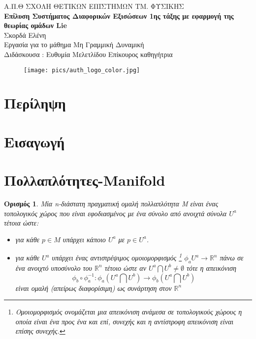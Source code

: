 \documentclass[12pt]{article}
\newtheorem*{definition}{Ορισμός}
\begin{document}
\begin{titlepage}
\begin{center}
\large{{\sc Α.Π.Θ} ΣΧΟΛΗ ΘΕΤΙΚΩΝ ΕΠΙΣΤΗΜΩΝ ΤΜ. ΦΥΣΙΚΗΣ}\\[0.5cm]
\vspace{1cm}
\LARGE\textbf{Επίλυση Συστήματος Διαφορικών Εξισώσεων 1ης τάξης με εφαρμογή της θεωρίας ομάδων \textlatin{Lie} }\\[1.0cm] 

\large{Σκορδά Ελένη}\\[0.2cm]

\vspace{1cm}
\small{Εργασία για το μάθημα Μη Γραμμική Δυναμική}\\[0.1cm] 
\small{Διδάσκουσα : Ευθυμία Μελετλίδου Επίκουρος καθηγήτρια }\\[0.2cm]

\begin{figure}[H]\centering
\texttt{[image: pics/auth\_logo\_color.jpg]}
\end{figure}
\end{center}
\vfill

\end{titlepage}

\newpage
\tableofcontents
\newpage
\section{Περίληψη}
\section{Εισαγωγή}
\section{Πολλαπλότητες-\textlatin{Manifold}}
\begin{definition}
Μία  \textlatin{n}-διάστατη πραγματική ομαλή πολλαπλότητα Μ είναι ένας τοπολογικός χώρος που είναι εφοδιασμένος με ένα σύνολο από ανοιχτά σύνολα $U^a$ τέτοια ώστε: 
\begin{itemize}
\item για κάθε $p \in M $ υπάρχει κάποιο $U^a$ με $p \in U^a$.
\item για κάθε $U^a$ υπάρχει ένας αντιστρέψιμος ομοιομορφισμός \footnote{Ομοιομορφισμός ονομάζεται μια απεικόνιση ανάμεσα σε τοπολογικούς χώρους η οποία είναι ένα προς ένα και επί, συνεχής και η αντίστροφη απεικόνιση είναι επίσης συνεχής.} $\phi_a U^a \rightarrow \mathbb{R}^n $ πάνω σε ένα ανοιχτό υποσύνολο του $\mathbb{R}^n$ τέτοιο ώστε αν $U^a \bigcap U^b \neq \emptyset $  τότε η απεικόνιση 
	\[ \phi_b \circ \phi_a ^{-1} :\phi_a (U^a \bigcap U^b) \rightarrow \phi_b(U^a \bigcap U^b)\]
είναι ομαλή (απείρως διαφορίσιμη) ως συνάρτηση στον $\mathbb{R}^n$
 \end{itemize}
\end{definition}
\nocite{topologysame}
\nocite{coordinateCharts}
\nocite{manifold}
\nocite{olver2000applications}
\end{document}
